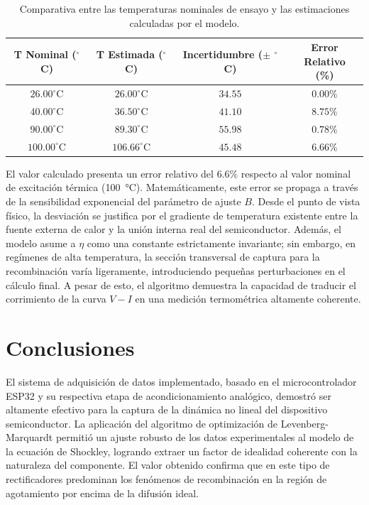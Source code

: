 \documentclass[conference]{IEEEtran}
\begin{document}
\begin{table}[htbp]
\caption{Comparativa entre las temperaturas nominales de ensayo y las estimaciones calculadas por el modelo.}
\begin{center}
\begin{tabular}{|c|c|c|c|}
\hline
\makecell{T Nominal\\($^\circ$C)} & \makecell{T Estimada\\($^\circ$C)} & \makecell{Incertidumbre\\($\pm$ $^\circ$C)} & \makecell{Error Relativo\\(\%)}\\
\hline
$26.00^\circ$C & $26.00^\circ$C & $34.55$ & $0.00\%$ \\
$40.00^\circ$C & $36.50^\circ$C & $41.10$ & $8.75\%$ \\
$90.00^\circ$C & $89.30^\circ$C & $55.98$ & $0.78\%$ \\
$100.00^\circ$C & $106.66^\circ$C & $45.48$ & $6.66\%$ \\
\hline
\end{tabular}
\label{tab:resultados_temp}
\end{center}
\end{table}

El valor calculado presenta un error relativo del $6.6\%$ respecto al valor nominal de excitación térmica (\SI{100}{\celsius}). Matemáticamente, este error se propaga a través de la sensibilidad exponencial del parámetro de ajuste $B$. Desde el punto de vista físico, la desviación se justifica por el gradiente de temperatura existente entre la fuente externa de calor y la unión interna real del semiconductor. Además, el modelo asume a $\eta$ como una constante estrictamente invariante; sin embargo, en regímenes de alta temperatura, la sección transversal de captura para la recombinación varía ligeramente, introduciendo pequeñas perturbaciones en el cálculo final. A pesar de esto, el algoritmo demuestra la capacidad de traducir el corrimiento de la curva $V-I$ en una medición termométrica altamente coherente.

\section{Conclusiones}

El sistema de adquisición de datos implementado, basado en el microcontrolador ESP32 y su respectiva etapa de acondicionamiento analógico, demostró ser altamente efectivo para la captura de la dinámica no lineal del dispositivo semiconductor. La aplicación del algoritmo de optimización de Levenberg-Marquardt permitió un ajuste robusto de los datos experimentales al modelo de la ecuación de Shockley, logrando extraer un factor de idealidad coherente con la naturaleza del componente. El valor obtenido confirma que en este tipo de rectificadores predominan los fenómenos de recombinación en la región de agotamiento por encima de la difusión ideal.
\end{document}
